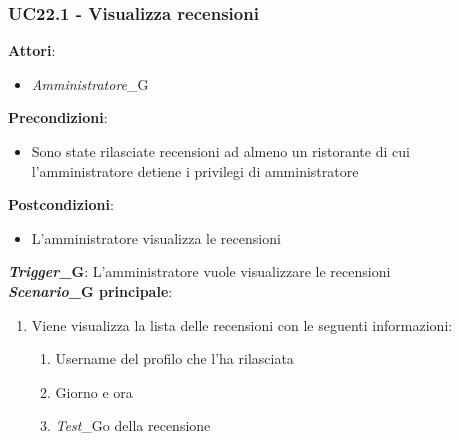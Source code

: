 \subsubsection{UC22.1 - Visualizza recensioni}\label{usecase:22_1}
\textbf{Attori}:
\begin{itemize}
    \item \textit{Amministratore}_G
\end{itemize}
\textbf{Precondizioni}:
\begin{itemize}
    \item Sono state rilasciate recensioni ad almeno un ristorante di cui l'amministratore detiene i privilegi di amministratore
\end{itemize}
\textbf{Postcondizioni}:
\begin{itemize}
    \item L'amministratore visualizza le recensioni
\end{itemize}
\textbf{\textit{Trigger}_G}:
L'amministratore vuole visualizzare le recensioni\\
\textbf{\textit{Scenario}_G principale}:
\begin{enumerate}
    \item Viene visualizza la lista delle recensioni con le seguenti informazioni:
    \begin{enumerate}
        \item Username del profilo che l'ha rilasciata
        \item Giorno e ora
        \item \textit{Test}_Go della recensione
    \end{enumerate}
\end{enumerate}
